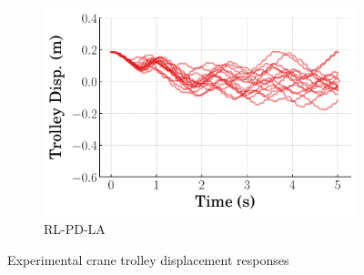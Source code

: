 \begin{figure}[h!]
\begin{subfigure}[b]{0.49\textwidth}
        \centering
        \includegraphics[width=\textwidth]{figures/figures_RL_model_based_control/time_responses_crane_experiments/RL-PD-LA_trolley_experiment.pdf}
        \caption{RL-PD-LA}
        \label{subfig_chap2:dpcrane_experiment_trolley_RL_PD_LA}
    \end{subfigure}
    \hfill
    \caption{Experimental crane trolley displacement responses}
    \label{fig_chap2:dpcrane_experiment_trolley}
\end{figure}
%

